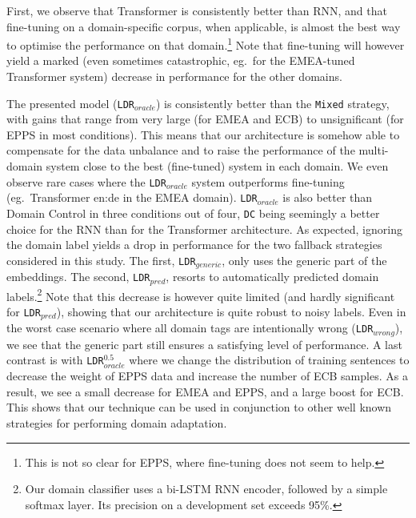 \documentclass[a4paper]{article}
\newcommand{\fyTodo}[1]{\Todo[FY:]{\textcolor{orange}{#1}}}
\newcommand{\fyDone}[1]{\done[FY]\Todo[FY:]{\textcolor{orange}{#1}}}
\begin{document}
First, we observe that Transformer is consistently better than RNN, and that fine-tuning on a domain-specific corpus, when applicable, is almost the best way to optimise the performance on that domain.\footnote{This is not so clear for EPPS, where fine-tuning does not seem to help.}  
Note that fine-tuning will however yield a marked (even sometimes catastrophic, eg.\ for the EMEA-tuned Transformer system) decrease in performance for the other domains. 

The presented model (\texttt{LDR}$_{oracle}$) is consistently better than the \texttt{Mixed} strategy, with gains that range from very large (for EMEA and ECB) to unsignificant (for EPPS in most conditions). 
This means that our architecture is somehow able to compensate for the data unbalance and to raise the performance of the multi-domain system close to the best (fine-tuned) system in each domain. 
We even observe rare cases where the \texttt{LDR}$_{oracle}$ system outperforms fine-tuning (eg.\ Transformer en:de in the EMEA domain). 
\texttt{LDR}$_{oracle}$ is also better than Domain Control in three conditions out of four, \texttt{DC} being seemingly a better choice for the RNN than for the Transformer architecture. 
As expected, ignoring the domain label yields a drop in performance for the two fallback strategies considered in this study. 
The first, \texttt{LDR}$_{generic}$, only uses the generic part of the embeddings. 
The second, \texttt{LDR}$_{pred}$, resorts to automatically predicted domain labels.\footnote{Our domain classifier uses a bi-LSTM RNN encoder, followed by a simple softmax layer. Its precision on a development set exceeds 95\%.}
Note that this decrease is however quite limited (and hardly significant for \texttt{LDR}$_{pred}$), showing that our architecture is quite robust to noisy labels. Even in the worst case scenario where all domain tags are intentionally wrong (\texttt{LDR}$_{wrong}$), we see that the generic part still ensures a satisfying level of performance. A last contrast is with \texttt{LDR}$_{oracle}^{0.5}$ where we change the distribution of training sentences to decrease the weight of EPPS data and increase the number of ECB samples. As a result, we see a small decrease for EMEA and EPPS, and a large boost for ECB. This shows that our technique can be used in conjunction to other well known strategies for performing domain adaptation. 


\end{document}
